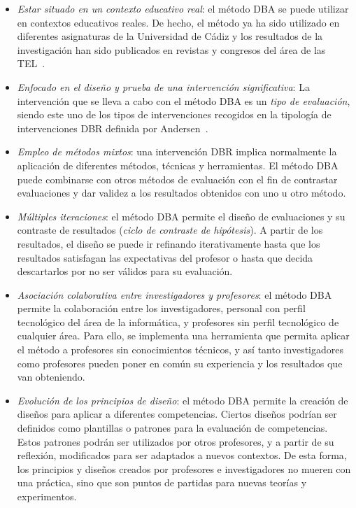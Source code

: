 \begin{itemize}
\item \emph{Estar situado en un contexto educativo real}: el método DBA se puede utilizar en contextos educativos reales. De hecho, el método ya ha sido utilizado en diferentes asignaturas de la Universidad de Cádiz y los resultados de la investigación han sido publicados en revistas y congresos del área de las TEL~\cite{Balderas:2012,Balderas:2013,balderas2013generative,Balderas:2015,balderas2015domain}.
\item \emph{Enfocado en el diseño y prueba de una intervención significativa}: La intervención que se lleva a cabo con el método DBA es un \emph{tipo de evaluación}, siendo este uno de los tipos de intervenciones recogidos en la tipología de intervenciones DBR definida por Andersen~\cite{anderson2012design}. 
\item \emph{Empleo de métodos mixtos}: una intervención DBR implica normalmente la aplicación de diferentes métodos, técnicas y herramientas. El método DBA puede combinarse con otros métodos de evaluación con el fin de contrastar evaluaciones y dar validez a los resultados obtenidos con uno u otro método.
\item \emph{Múltiples iteraciones}: el método DBA permite el diseño de evaluaciones y su contraste de resultados (\emph{ciclo de contraste de hipótesis}). A partir de los resultados, el diseño se puede ir refinando iterativamente hasta que los resultados satisfagan las expectativas del profesor o hasta que decida descartarlos por no ser válidos para su evaluación.
\item \emph{Asociación colaborativa entre investigadores y profesores}: el método DBA permite la colaboración entre los investigadores, personal con perfil tecnológico del área de la informática, y profesores sin perfil tecnológico de cualquier área. Para ello, se implementa una herramienta que permita aplicar el método a profesores sin conocimientos técnicos, y así tanto investigadores como profesores pueden poner en común su experiencia y los resultados que van obteniendo.
\item \emph{Evolución de los principios de diseño}: el método DBA permite la creación de diseños para aplicar a diferentes competencias. Ciertos diseños podrían ser definidos como plantillas o patrones para la evaluación de competencias. Estos patrones podrán ser utilizados por otros profesores, y a partir de su reflexión, modificados para ser adaptados a nuevos contextos. De esta forma, los principios y diseños creados por profesores e investigadores no mueren con una práctica, sino que son puntos de partidas para nuevas teorías y experimentos.

\end{itemize}
